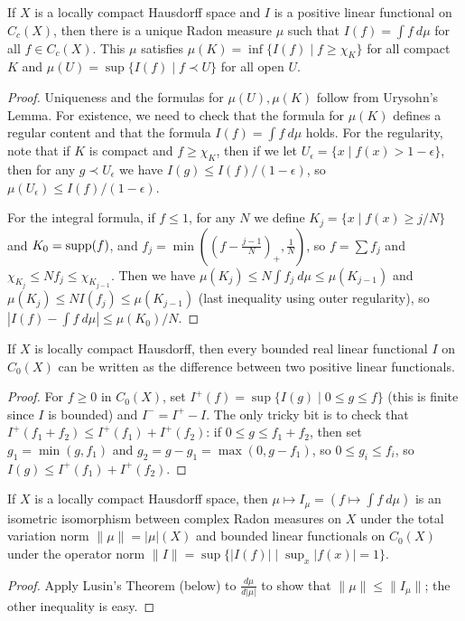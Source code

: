 \begin{thm} If $X$ is a locally compact Hausdorff space and $I$ is a positive linear functional on $C_c(X)$, then there is a unique Radon measure $\mu$ such that $I(f) = \int f\ d\mu$ for all $f \in C_c(X)$. This $\mu$ satisfies $\mu(K) = \inf\{I(f) \mid f \ge \chi_K\}$ for all compact $K$ and $\mu(U) = \sup\{I(f) \mid f \prec U\}$ for all open $U$.
\end{thm}
\begin{proof} Uniqueness and the formulas for $\mu(U), \mu(K)$ follow from Urysohn's Lemma. For existence, we need to check that the formula for $\mu(K)$ defines a regular content and that the formula $I(f) = \int f\ d\mu$ holds. For the regularity, note that if $K$ is compact and $f \ge \chi_K$, then if we let $U_\epsilon = \{x \mid f(x) > 1 - \epsilon\}$, then for any $g \prec U_\epsilon$ we have $I(g) \le I(f)/(1-\epsilon)$, so $\mu(U_\epsilon) \le I(f)/(1-\epsilon)$.

For the integral formula, if $f \le 1$, for any $N$ we define $K_j = \{x \mid f(x) \ge j/N\}$ and $K_0 = \operatorname{supp}(f)$, and $f_j = \min((f - \frac{j-1}{N})_+, \frac{1}{N})$, so $f = \sum f_j$ and $\chi_{K_j} \le Nf_j \le \chi_{K_{j-1}}$. Then we have $\mu(K_j) \le N\int f_j\ d\mu \le \mu(K_{j-1})$ and $\mu(K_j) \le NI(f_j) \le \mu(K_{j-1})$ (last inequality using outer regularity), so $|I(f) - \int f\ d\mu| \le \mu(K_0)/N$.
\end{proof}

\begin{lem} If $X$ is locally compact Hausdorff, then every bounded real linear functional $I$ on $C_0(X)$ can be written as the difference between two positive linear functionals.
\end{lem}
\begin{proof} For $f \ge 0$ in $C_0(X)$, set $I^+(f) = \sup\{I(g) \mid 0 \le g \le f\}$ (this is finite since $I$ is bounded) and $I^- = I^+ - I$. The only tricky bit is to check that $I^+(f_1 + f_2) \le I^+(f_1) + I^+(f_2)$: if $0 \le g \le f_1 + f_2$, then set $g_1 = \min(g,f_1)$ and $g_2 = g - g_1 = \max(0,g-f_1)$, so $0 \le g_i \le f_i$, so $I(g) \le I^+(f_1) + I^+(f_2)$.
\end{proof}

\begin{thm} If $X$ is a locally compact Hausdorff space, then $\mu \mapsto I_\mu = (f \mapsto \int f\ d\mu)$ is an isometric isomorphism between complex Radon measures on $X$ under the total variation norm $\|\mu\| = |\mu|(X)$ and bounded linear functionals on $C_0(X)$ under the operator norm $\|I\| = \sup\{|I(f)| \mid \sup_x |f(x)| = 1\}$.
\end{thm}
\begin{proof} Apply Lusin's Theorem (below) to $\frac{d\mu}{d|\mu|}$ to show that $\|\mu\| \le \|I_\mu\|$; the other inequality is easy.
\end{proof}


